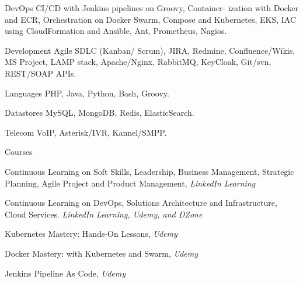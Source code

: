 
\begin{cvdesc}

  \cvdesch
    {DevOps} %
    {CI/CD with Jenkins pipelines on Groovy, Container- ization with Docker and ECR, Orchestration on Docker Swarm, Compose and Kubernetes, EKS, IAC using CloudFormation and Ansible, Ant, Prometheus, Nagios.} %

  \cvdesch
    {Development} %
    {Agile SDLC (Kanban/ Scrum), JIRA, Redmine, Confluence/Wikis, MS Project, LAMP stack, Apache/Nginx, RabbitMQ, KeyCloak, Git/svn, REST/SOAP APIs.} %

  \cvdesch
    {Languages} %
    {PHP, Java, Python, Bash, Groovy.} %

  \cvdesch
    {Datastores} %
    {MySQL, MongoDB, Redis, ElasticSearch.} %

  \cvdesch
    {Telecom} %
    {VoIP, Asterisk/IVR, Kannel/SMPP.} %

\end{cvdesc}

\begin{cvdesc}
  \cvdescv
    {Courses}
    {
      \begin{cvitems}
      \item {Continuous Learning on Soft Skills, Leadership, Business Management, Strategic Planning, Agile Project and Product Management, \textit{LinkedIn Learning}}
      \item {Continuous Learning on DevOps, Solutions Architecture and Infrastructure, Cloud Services. \textit{LinkedIn Learning, Udemy, and DZone}}
      \item {Kubernetes Mastery: Hands-On Lessons, \textit{Udemy}}
      \item {Docker Mastery: with Kubernetes and Swarm, \textit{Udemy}}
      \item {Jenkins Pipeline As Code, \textit{Udemy}}
      \end{cvitems}
    }

\end{cvdesc}
